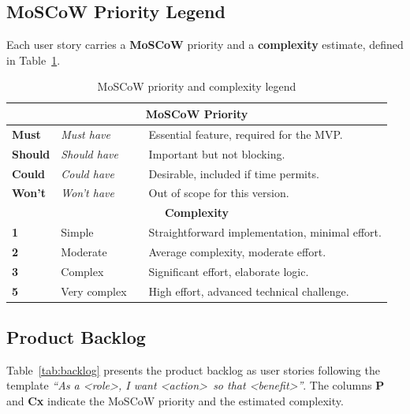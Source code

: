 \subsection{MoSCoW Priority Legend}

Each user story carries a \textbf{MoSCoW} priority and a
\textbf{complexity} estimate, defined in Table~\ref{tab:moscow}.

\begin{table}[H]
  \centering
  \caption{MoSCoW priority and complexity legend}
  \label{tab:moscow}
  \begin{tabularx}{\textwidth}{lllX}
    \toprule
    \multicolumn{4}{c}{\textbf{MoSCoW Priority}} \\
    \midrule
    \cellcolor{moscowMust}\textbf{Must}     & \textit{Must have}   & & Essential feature, required for the MVP. \\
    \cellcolor{moscowShould}\textbf{Should} & \textit{Should have} & & Important but not blocking. \\
    \cellcolor{moscowCould}\textbf{Could}   & \textit{Could have}  & & Desirable, included if time permits. \\
    \cellcolor{moscowWont}\textbf{Won't}    & \textit{Won't have}  & & Out of scope for this version. \\
    \midrule
    \multicolumn{4}{c}{\textbf{Complexity}} \\
    \midrule
    \cellcolor{complexLow}\textbf{1}   & Simple       & & Straightforward implementation, minimal effort. \\
    \cellcolor{complexMed}\textbf{2}   & Moderate     & & Average complexity, moderate effort. \\
    \cellcolor{complexHigh}\textbf{3}  & Complex      & & Significant effort, elaborate logic. \\
    \cellcolor{complexVHigh}\textbf{5} & Very complex & & High effort, advanced technical challenge. \\
    \bottomrule
  \end{tabularx}
\end{table}

\subsection{Product Backlog}

Table~\ref{tab:backlog} presents the product backlog as user stories
following the template \textit{``As a \textless role\textgreater, I want
\textless action\textgreater\ so that \textless benefit\textgreater''}.
The columns \textbf{P} and \textbf{Cx} indicate the MoSCoW priority and
the estimated complexity.

